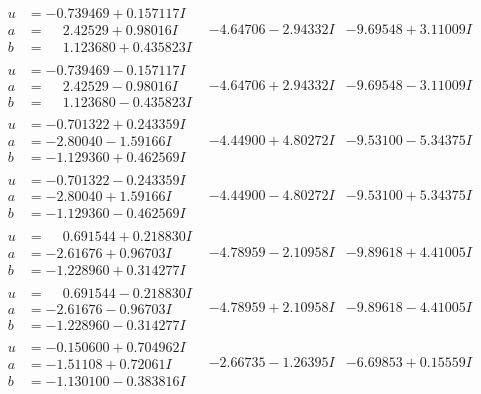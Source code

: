 \documentclass[1p]{elsarticle_modified}
\theoremstyle{definition}
\begin{document}
$$\begin{array}{c|c|c}
\begin{aligned}
u &= -0.739469 + 0.157117 I \\
a &= \phantom{-}2.42529 + 0.98016 I \\
b &= \phantom{-}1.123680 + 0.435823 I\end{aligned}
 & -4.64706 - 2.94332 I & -9.69548 + 3.11009 I \\ \hline\begin{aligned}
u &= -0.739469 - 0.157117 I \\
a &= \phantom{-}2.42529 - 0.98016 I \\
b &= \phantom{-}1.123680 - 0.435823 I\end{aligned}
 & -4.64706 + 2.94332 I & -9.69548 - 3.11009 I \\ \hline\begin{aligned}
u &= -0.701322 + 0.243359 I \\
a &= -2.80040 - 1.59166 I \\
b &= -1.129360 + 0.462569 I\end{aligned}
 & -4.44900 + 4.80272 I & -9.53100 - 5.34375 I \\ \hline\begin{aligned}
u &= -0.701322 - 0.243359 I \\
a &= -2.80040 + 1.59166 I \\
b &= -1.129360 - 0.462569 I\end{aligned}
 & -4.44900 - 4.80272 I & -9.53100 + 5.34375 I \\ \hline\begin{aligned}
u &= \phantom{-}0.691544 + 0.218830 I \\
a &= -2.61676 + 0.96703 I \\
b &= -1.228960 + 0.314277 I\end{aligned}
 & -4.78959 - 2.10958 I & -9.89618 + 4.41005 I \\ \hline\begin{aligned}
u &= \phantom{-}0.691544 - 0.218830 I \\
a &= -2.61676 - 0.96703 I \\
b &= -1.228960 - 0.314277 I\end{aligned}
 & -4.78959 + 2.10958 I & -9.89618 - 4.41005 I \\ \hline\begin{aligned}
u &= -0.150600 + 0.704962 I \\
a &= -1.51108 + 0.72061 I \\
b &= -1.130100 - 0.383816 I\end{aligned}
 & -2.66735 - 1.26395 I & -6.69853 + 0.15559 I \\ \hline\begin{aligned}

\end{aligned}
\end{array}$$
\end{document}
